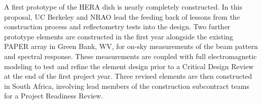 \documentclass[preprint]{aastex}
\begin{document}

A first prototype of the HERA dish is nearly completely constructed.  In this
proposal, UC Berkeley and NRAO 
lead the feeding back of lessons from the
construction process and reflectometry tests into the design.
Two further prototype elements are constructed in the first year alongside the existing
PAPER array in Green Bank, WV,
for on-sky measurements of the beam pattern and spectral 
response.
These measurements are coupled with full electromagnetic modeling to test
and refine the element design prior to a Critical Design Review at the end of the first project
year.  Three revised elements are then constructed in South Africa, involving
lead members of the construction subcontract teams for a Project Readiness Review.  %




\end{document}

